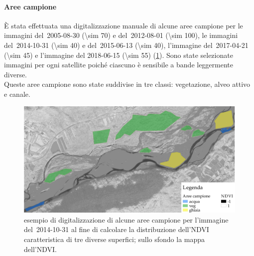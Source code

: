 \paragraph{Aree campione}
\`{E} stata effettuata una digitalizzazione manuale di alcune aree campione per le immagini \AST{} del~2005-08-30 (\num{\sim 70}) e del~2012-08-01 (\num{\sim 100}), le immagini \Pl{} del~2014-10-31 (\num{\sim 40}) e del~2015-06-13 (\num{\sim 40}), l'immagine \Se{} del~2017-04-21 (\num{\sim 45}) e l'immagine \WV{} del 2018-06-15 (\num{\sim 55}) (\cref{fig:esempio-aree-campione}).
	Sono state selezionate immagini per ogni satellite poiché ciascuno è sensibile a bande leggermente diverse. 
	\\
	Queste aree campione sono state suddivise in tre classi: vegetazione, alveo attivo e canale.
	\begin{figure}[ht]
		\centering
		\includegraphics[width=\textwidth]{files/esempio_aree_campione_2014_10_31.jpeg}
		\caption[esempio di aree campione per calcolare la distribuzione dell'NDVI]{esempio di digitalizzazione di alcune aree campione per l'immagine \Pl{} del~2014-10-31 al fine di calcolare la distribuzione dell'NDVI caratteristica di tre diverse superfici; sullo sfondo la mappa dell'NDVI.}
		\label{fig:esempio-aree-campione}
	\end{figure}
